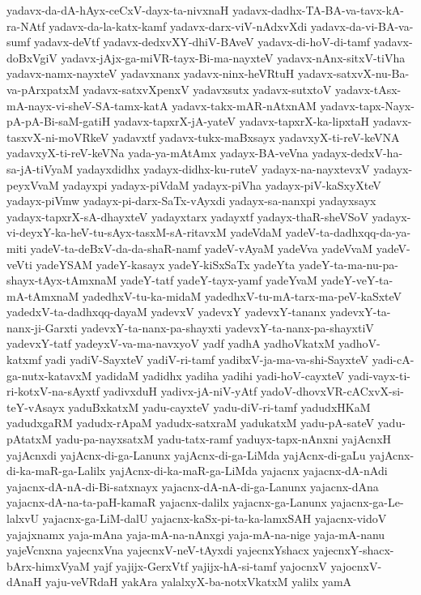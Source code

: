 {yadavx-da-dA-hAyx-ceCxV-dayx-ta-nivxnaH
yadavx-dadhx-TA-BA-va-tavx-kA-ra-NAtf
yadavx-da-la-katx-kamf
yadavx-darx-viV-nAdxvXdi
yadavx-da-vi-BA-va-sumf
yadavx-deVtf
yadavx-dedxvXY-dhiV-BAveV
yadavx-di-hoV-di-tamf
yadavx-doBxVgiV
yadavx-jAjx-ga-miVR-tayx-Bi-ma-nayxteV
yadavx-nAnx-sitxV-tiVha
yadavx-namx-nayxteV
yadavxnanx
yadavx-ninx-heVRtuH
yadavx-satxvX-nu-Ba-va-pArxpatxM
yadavx-satxvXpenxV
yadavxsutx
yadavx-sutxtoV
yadavx-tAsx-mA-nayx-vi-sheV-SA-tamx-katA
yadavx-takx-mAR-nAtxnAM
yadavx-tapx-Nayx-pA-pA-Bi-saM-gatiH
yadavx-tapxrX-jA-yateV
yadavx-tapxrX-ka-lipxtaH
yadavx-tasxvX-ni-moVRkeV
yadavxtf
yadavx-tukx-maBxsayx
yadavxyX-ti-reV-keVNA
yadavxyX-ti-reV-keVNa
yada-ya-mAtAmx
yadayx-BA-veVna
yadayx-dedxV-ha-sa-jA-tiVyaM
yadayxdidhx
yadayx-didhx-ku-ruteV
yadayx-na-nayxtevxV
yadayx-peyxVvaM
yadayxpi
yadayx-piVdaM
yadayx-piVha
yadayx-piV-kaSxyXteV
yadayx-piVmw
yadayx-pi-darx-SaTx-vAyxdi
yadayx-sa-nanxpi
yadayxsayx
yadayx-tapxrX-sA-dhayxteV
yadayxtarx
yadayxtf
yadayx-thaR-sheVSoV
yadayx-vi-deyxY-ka-heV-tu-sAyx-tasxM-sA-ritavxM
yadeVdaM
yadeV-ta-dadhxqq-da-ya-miti
yadeV-ta-deBxV-da-da-shaR-namf
yadeV-vAyaM
yadeVva
yadeVvaM
yadeV-veVti
yadeYSAM
yadeY-kasayx
yadeY-kiSxSaTx
yadeYta
yadeY-ta-ma-nu-pa-shayx-tAyx-tAmxnaM
yadeY-tatf
yadeY-tayx-yamf
yadeYvaM
yadeY-veY-ta-mA-tAmxnaM
yadedhxV-tu-ka-midaM
yadedhxV-tu-mA-tarx-ma-peV-kaSxteV
yadedxV-ta-dadhxqq-dayaM
yadevxV
yadevxY
yadevxY-tananx
yadevxY-ta-nanx-ji-Garxti
yadevxY-ta-nanx-pa-shayxti
yadevxY-ta-nanx-pa-shayxtiV
yadevxY-tatf
yadeyxV-va-ma-navxyoV
yadf
yadhA
yadhoVkatxM
yadhoV-katxmf
yadi
yadiV-SayxteV
yadiV-ri-tamf
yadibxV-ja-ma-va-shi-SayxteV
yadi-cA-ga-nutx-katavxM
yadidaM
yadidhx
yadiha
yadihi
yadi-hoV-cayxteV
yadi-vayx-ti-ri-kotxV-na-sAyxtf
yadivxduH
yadivx-jA-niV-yAtf
yadoV-dhovxVR-cACxvX-si-teY-vAsayx
yaduBxkatxM
yadu-cayxteV
yadu-diV-ri-tamf
yadudxHKaM
yadudxgaRM
yadudx-rApaM
yadudx-satxraM
yadukatxM
yadu-pA-sateV
yadu-pAtatxM
yadu-pa-nayxsatxM
yadu-tatx-ramf
yaduyx-tapx-nAnxni
yajAcnxH
yajAcnxdi
yajAcnx-di-ga-Lanunx
yajAcnx-di-ga-LiMda
yajAcnx-di-gaLu
yajAcnx-di-ka-maR-ga-Lalilx
yajAcnx-di-ka-maR-ga-LiMda
yajacnx
yajacnx-dA-nAdi
yajacnx-dA-nA-di-Bi-satxnayx
yajacnx-dA-nA-di-ga-Lanunx
yajacnx-dAna
yajacnx-dA-na-ta-paH-kamaR
yajacnx-dalilx
yajacnx-ga-Lanunx
yajacnx-ga-Le-lalxvU
yajacnx-ga-LiM-dalU
yajacnx-kaSx-pi-ta-ka-lamxSAH
yajacnx-vidoV
yajajxnamx
yaja-mAna
yaja-mA-na-nAnxgi
yaja-mA-na-nige
yaja-mA-nanu
yajeVcnxna
yajecnxVna
yajecnxV-neV-tAyxdi
yajecnxYshacx
yajecnxY-shacx-bArx-himxVyaM
yajf
yajijx-GerxVtf
yajijx-hA-si-tamf
yajocnxV
yajocnxV-dAnaH
yaju-veVRdaH
yakAra
yalalxyX-ba-notxVkatxM
yalilx
yamA
}
